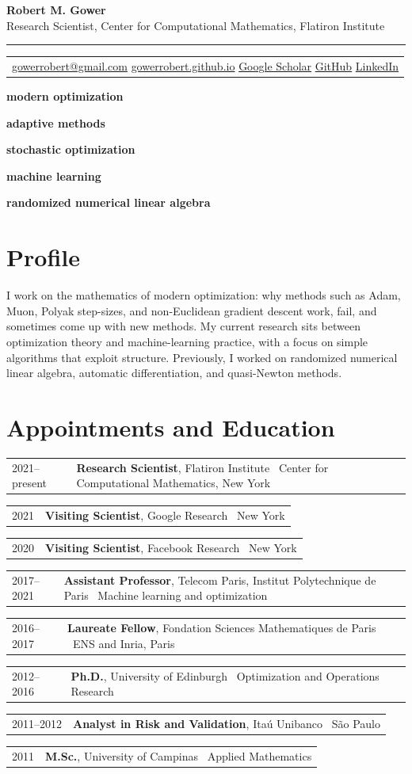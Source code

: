 \documentclass[10pt,letterpaper]{article}
\makeatletter
\newcommand{\cvtag}[1]{%
  \begingroup
  \setlength{\fboxsep}{2.4pt}%
  \colorbox{soft}{\textcolor{accent}{\scriptsize\bfseries #1}}%
  \endgroup
}
\newcommand{\entry}[4]{%
  \par\noindent
  \begin{tabularx}{\textwidth}{@{}p{0.15\textwidth}X@{}}
    \textcolor{muted}{#1} & \textbf{#2}#3 {\footnotesize\textcolor{muted}{\textperiodcentered\ #4}}
  \end{tabularx}\par\vspace{0.14em}
}
\makeatother
\begin{document}
{\huge\bfseries Robert M. Gower}\\[0.4em]
{\large\color{muted}Research Scientist, Center for Computational Mathematics, Flatiron Institute}\\[0.45em]
{\color{rule}\hrule}
\vspace{0.45em}

\begin{tabularx}{\textwidth}{@{}X@{}}
\href{mailto:gowerrobert@gmail.com}{gowerrobert@gmail.com} \quad
\href{https://gowerrobert.github.io}{gowerrobert.github.io} \quad
\href{https://scholar.google.com/citations?user=okKw87MAAAAJ\&hl=en}{Google Scholar} \quad
\href{https://github.com/gowerrobert}{GitHub} \quad
\href{https://www.linkedin.com/in/robert-mansel-gower-a27bba23}{LinkedIn}
\end{tabularx}

\vspace{0.45em}
\cvtag{modern optimization}
\cvtag{adaptive methods}
\cvtag{stochastic optimization}
\cvtag{machine learning}
\cvtag{randomized numerical linear algebra}

\section{Profile}
I work on the mathematics of modern optimization: why methods such as Adam, Muon, Polyak step-sizes, and non-Euclidean gradient descent work, fail, and sometimes come up with new methods. My current research sits between optimization theory and machine-learning practice, with a focus on simple algorithms that exploit structure. Previously, I worked on randomized numerical linear algebra, automatic differentiation, and quasi-Newton methods.

\section{Appointments and Education}
\entry{2021--present}{Research Scientist}{, Flatiron Institute}{Center for Computational Mathematics, New York}
\entry{2021}{Visiting Scientist}{, Google Research}{New York}
\entry{2020}{Visiting Scientist}{, Facebook Research}{New York}
\entry{2017--2021}{Assistant Professor}{, Telecom Paris, Institut Polytechnique de Paris}{Machine learning and optimization}
\entry{2016--2017}{Laureate Fellow}{, Fondation Sciences Mathematiques de Paris}{ENS and Inria, Paris}
\entry{2012--2016}{Ph.D.}{, University of Edinburgh}{Optimization and Operations Research}
\entry{2011--2012}{Analyst in Risk and Validation}{, Ita\'u Unibanco}{S\~ao Paulo}
\entry{2011}{M.Sc.}{, University of Campinas}{Applied Mathematics}
\end{document}
